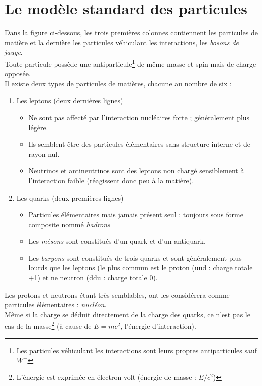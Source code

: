 \documentclass[british,french,11pt, a4paper, openany]{book}
\begin{document}
	\section{Le modèle standard des particules}
	Dans la figure ci-dessous, les trois premières colonnes contiennent les particules de matière et la dernière les particules véhiculant les interactions, les \textit{bosons de jauge}.\\
	Toute particule possède une antiparticule\footnote{Les particules véhiculant les interactions sont leurs propres antiparticules sauf $W^\pm$} de même masse et spin mais de charge opposée.\\
	
	Il existe deux types de particules de matières, chacune au nombre de six : 
	\begin{enumerate}
		\item Les leptons (deux dernières lignes)
		\begin{itemize}
			\item Ne sont pas affecté par l'interaction nucléaires forte ; généralement plus légère.
			\item Ils semblent être des particules élémentaires sans structure interne et de rayon nul.
			\item Neutrinos et antineutrinos sont des leptons non chargé sensiblement à l'interaction faible (réagissent donc peu à la matière).
		\end{itemize} 
		\item Les quarks (deux premières lignes)
		\begin{itemize}
			\item Particules élémentaires mais jamais présent seul : toujours sous forme composite nommé \textit{hadrons}
			\item Les \textit{mésons} sont constitués d'un quark et d'un antiquark.
			\item Les \textit{baryons} sont constitués de trois quarks et sont généralement plus lourds que les leptons (le plus commun est le proton (uud : charge totale +1) et ne neutron (ddu : charge totale 0).
		\end{itemize}
	\end{enumerate}
	Les protons et neutrons étant très semblables, ont les considérera comme particules élémentaires : \textit{nucléon}.\\
	Même si la charge se déduit directement de la charge des quarks, ce n'est pas le cas de la masse\footnote{L'énergie est exprimée en électron-volt (énergie de masse : $E/c^2$)} (à cause de $E = mc^2$, l'énergie d'interaction).\\
	
\end{document}
